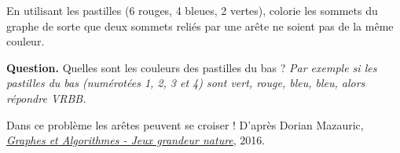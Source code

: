 \documentclass[class=report,crop=false, 12pt]{standalone}
\begin{document}
\begin{enigme}[Graphe]

En utilisant les pastilles (6 rouges, 4 bleues, 2 vertes), colorie les sommets du graphe de sorte que deux sommets reliés par une arête ne soient pas de la même couleur.



\bigskip

\textbf{Question.} Quelles sont les couleurs des pastilles du bas ?
\emph{Par exemple si les pastilles du bas (numérotées 1, 2, 3 et 4) sont vert, rouge, bleu, bleu, alors répondre VRBB.}

\bigskip

{\footnotesize Dans ce problème les arêtes peuvent se croiser ! D'après Dorian Mazauric, \href{https://hal.inria.fr/hal-01366804}{\emph{Graphes et Algorithmes - Jeux grandeur nature}}, 2016.}

%
%

\end{enigme}


%
\end{document}
